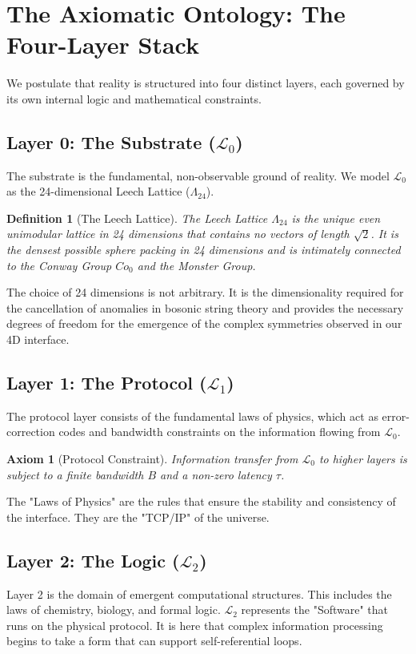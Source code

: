 \documentclass[11pt,onecolumn]{article}
\newcommand{\substrate}{\mathcal{L}_0}
\newcommand{\protocol}{\mathcal{L}_1}
\newcommand{\logic}{\mathcal{L}_2}
\newcommand{\leech}{\Lambda_{24}}
\newcommand{\conway}{Co_0}
\newtheorem{definition}{Definition}
\newtheorem{axiom}{Axiom}
\begin{document}
\section{The Axiomatic Ontology: The Four-Layer Stack}

We postulate that reality is structured into four distinct layers, each governed by its own internal logic and mathematical constraints.

\subsection{Layer 0: The Substrate ($\substrate$)}
The substrate is the fundamental, non-observable ground of reality. We model $\substrate$ as the 24-dimensional Leech Lattice ($\leech$). 
\begin{definition}[The Leech Lattice]
The Leech Lattice $\leech$ is the unique even unimodular lattice in 24 dimensions that contains no vectors of length $\sqrt{2}$. It is the densest possible sphere packing in 24 dimensions and is intimately connected to the Conway Group $\conway$ and the Monster Group.
\end{definition}
The choice of 24 dimensions is not arbitrary. It is the dimensionality required for the cancellation of anomalies in bosonic string theory and provides the necessary degrees of freedom for the emergence of the complex symmetries observed in our 4D interface.

\subsection{Layer 1: The Protocol ($\protocol$)}
The protocol layer consists of the fundamental laws of physics, which act as error-correction codes and bandwidth constraints on the information flowing from $\substrate$. 
\begin{axiom}[Protocol Constraint]
Information transfer from $\substrate$ to higher layers is subject to a finite bandwidth $B$ and a non-zero latency $\tau$.
\end{axiom}
The "Laws of Physics" are the rules that ensure the stability and consistency of the interface. They are the "TCP/IP" of the universe.

\subsection{Layer 2: The Logic ($\logic$)}
Layer 2 is the domain of emergent computational structures. This includes the laws of chemistry, biology, and formal logic. $\logic$ represents the "Software" that runs on the physical protocol. It is here that complex information processing begins to take a form that can support self-referential loops.
\end{document}
